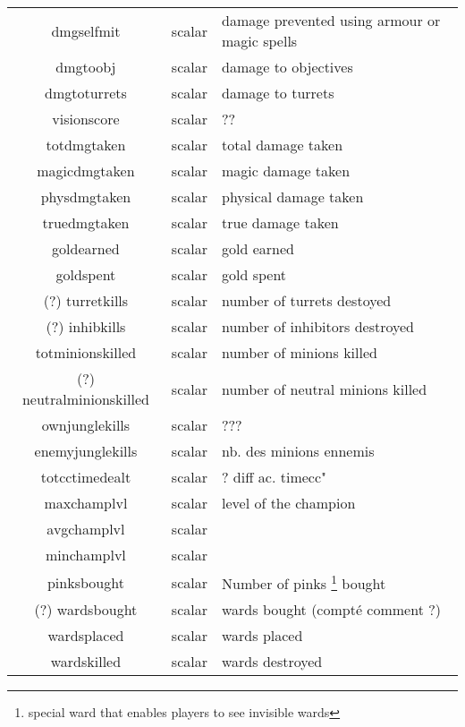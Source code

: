 \begin{longtable}{|c|c|l|}
        dmgselfmit                  & scalar          & damage prevented using armour or magic spells\\
        dmgtoobj                    & scalar          & damage to objectives\\
        dmgtoturrets                & scalar          & damage to turrets\\
        visionscore                 & scalar          & ??\\
        totdmgtaken                 & scalar          & total damage taken\\
        magicdmgtaken               & scalar          & magic damage taken\\
        physdmgtaken                & scalar          & physical damage taken\\
        truedmgtaken                & scalar          & true damage taken\\
        goldearned                  & scalar          & gold earned\\
        goldspent                   & scalar          & gold spent\\
        (?) turretkills             & scalar          & number of turrets destoyed\\
        (?) inhibkills              & scalar          & number of inhibitors destroyed\\
        totminionskilled            & scalar          & number of minions killed\\
        (?) neutralminionskilled    & scalar          & number of neutral minions killed\\
        ownjunglekills              & scalar          & ???\\
        enemyjunglekills            & scalar          & nb. des minions ennemis \\
        totcctimedealt              & scalar          & ? diff ac. timecc"\\
        maxchamplvl                 & scalar          & level of the champion\\
        avgchamplvl                 & scalar          & \\
        minchamplvl                 & scalar          & \\
        pinksbought                 & scalar          & Number of pinks \footnote{special ward that enables players to see invisible wards}  bought\\
        (?) wardsbought             & scalar          & wards bought (compté comment ?)\\
        wardsplaced                 & scalar          & wards placed\\
        wardskilled                 & scalar          & wards destroyed\\
        \hline
\end{longtable}
\newpage

